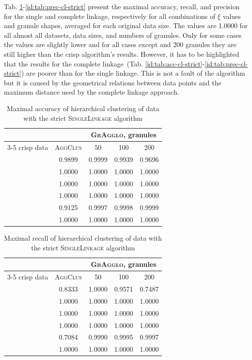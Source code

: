 \documentclass{amcs}
\newcommand{\blobs}{\dataset{blobs}}
\newcommand{\circles}{\dataset{circles}}
\newcommand{\corners}{\dataset{corners}}
\newcommand{\crescents}{\dataset{crescents}}
\newcommand{\laguna}{\dataset{laguna}}
\newcommand{\spheres}{\dataset{spheres}}
\newcommand{\procedura}[1]{\textsc{#1}}
\newcommand{\SingleLinkage}{\procedura{Si\-ng\-le\-Lin\-ka\-ge}}
\newcommand{\abbrAgglomerativeClustering}{\procedura{AggClus}}
\newcommand{\MojAlg}{\procedura{GrAgglo}}
\begin{document}
Tab. 
\ref{id:tab:acc-sl-strict}-\ref{id:tab:prec-cl-strict}
present the maximal accuracy, recall, and precision for the single and complete linkage, respectively for all combinations of $\xi$ values and granule shapes, averaged for each original data size.
The values are \num{1.0000} for all almost all datasets, data sizes, and numbers of granules.
Only for some cases the values are slightly lower and for all cases except \blobs{} and 200 granules they are still higher than the crisp algorithm's results.
However, it has to be highlighted that the results for the complete linkage\  (Tab. \ref{id:tab:acc-cl-strict}-\ref{id:tab:prec-cl-strict}) are poorer than for the single linkage.
This is not a fault of the algorithm but it is caused by the geometrical relations between data points and the maximum distance used by the complete linkage approach.
 


 \begin{table}
	\centering
    \caption{Maximal accuracy of hierarchical clustering of data with the strict \SingleLinkage{} algorithm}
	\label{id:tab:acc-sl-strict}
	\begin{tabular}{lcccc}
		\toprule
		&  & \multicolumn{3}{c}{\MojAlg, granules} \\
		\cmidrule(lr){3-5}
		{crisp data} & \abbrAgglomerativeClustering & 50  & 100  & 200   \\
		\midrule
		\blobs\ & 0.9899 & 0.9999 & 0.9939 & 0.9696 \\
		\circles\ & 1.0000 & 1.0000 & 1.0000 & 1.0000 \\
		\corners\ & 1.0000 & 1.0000 & 1.0000 & 1.0000 \\
		\crescents\ & 1.0000 & 1.0000 & 1.0000 & 1.0000 \\
		\laguna\ & 0.9125 & 0.9997 & 0.9998 & 0.9999 \\
		\spheres\ & 1.0000 & 1.0000 & 1.0000 & 1.0000 \\
		\bottomrule
	\end{tabular}
\end{table}

\begin{table}
	\centering
   \caption{Maximal recall of hierarchical clustering of data with the strict \SingleLinkage{} algorithm}
	\label{id:tab:rec-sl-strict}
	\begin{tabular}{lcccc}
		\toprule
		&  & \multicolumn{3}{c}{\MojAlg, granules} \\
		\cmidrule(lr){3-5}
		{crisp data} & \abbrAgglomerativeClustering & 50  & 100  & 200   \\
		\midrule
		\blobs\ & 0.8333 & 1.0000 & 0.9571 & 0.7487 \\
		\circles\ & 1.0000 & 1.0000 & 1.0000 & 1.0000 \\
		\corners\ & 1.0000 & 1.0000 & 1.0000 & 1.0000 \\
		\crescents\ & 1.0000 & 1.0000 & 1.0000 & 1.0000 \\
		\laguna\ & 0.7084 & 0.9990 & 0.9995 & 0.9997 \\
		\spheres\ & 1.0000 & 1.0000 & 1.0000 & 1.0000 \\
		\bottomrule
	\end{tabular}
\end{table}  
\end{document}

